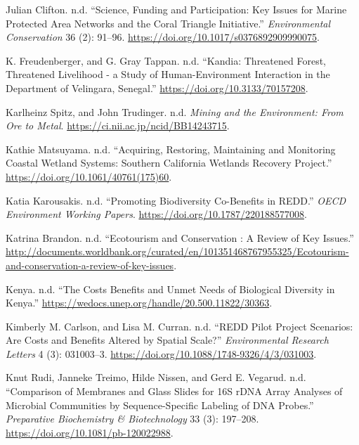 \begin{CSLReferences}{1}{0}
Julian Clifton. n.d. {``Science, Funding and Participation: Key Issues
for Marine Protected Area Networks and the Coral Triangle Initiative.''}
\emph{Environmental Conservation} 36 (2): 91--96.
\url{https://doi.org/10.1017/s0376892909990075}.

K. Freudenberger, and G. Gray Tappan. n.d. {``Kandia: Threatened Forest,
Threatened Livelihood - a Study of Human-Environment Interaction in the
Department of Velingara, Senegal.''}
\url{https://doi.org/10.3133/70157208}.

Karlheinz Spitz, and John Trudinger. n.d. \emph{Mining and the
Environment: From Ore to Metal}.
\url{https://ci.nii.ac.jp/ncid/BB14243715}.

Kathie Matsuyama. n.d. {``Acquiring, Restoring, Maintaining and
Monitoring Coastal Wetland Systems: Southern California Wetlands
Recovery Project.''} \url{https://doi.org/10.1061/40761(175)60}.

Katia Karousakis. n.d. {``Promoting Biodiversity Co-Benefits in REDD.''}
\emph{OECD Environment Working Papers}.
\url{https://doi.org/10.1787/220188577008}.

Katrina Brandon. n.d. {``Ecotourism and Conservation : A Review of Key
Issues.''}
\url{http://documents.worldbank.org/curated/en/101351468767955325/Ecotourism-and-conservation-a-review-of-key-issues}.

Kenya. n.d. {``The Costs Benefits and Unmet Needs of Biological
Diversity in Kenya.''}
\url{https://wedocs.unep.org/handle/20.500.11822/30363}.

Kimberly M. Carlson, and Lisa M. Curran. n.d. {``REDD Pilot Project
Scenarios: Are Costs and Benefits Altered by Spatial Scale?''}
\emph{Environmental Research Letters} 4 (3): 031003--3.
\url{https://doi.org/10.1088/1748-9326/4/3/031003}.

Knut Rudi, Janneke Treimo, Hilde Nissen, and Gerd E. Vegarud. n.d.
{``Comparison of Membranes and Glass Slides for 16S rDNA Array Analyses
of Microbial Communities by Sequence-Specific Labeling of DNA Probes.''}
\emph{Preparative Biochemistry \& Biotechnology} 33 (3): 197--208.
\url{https://doi.org/10.1081/pb-120022988}.


\end{CSLReferences}

